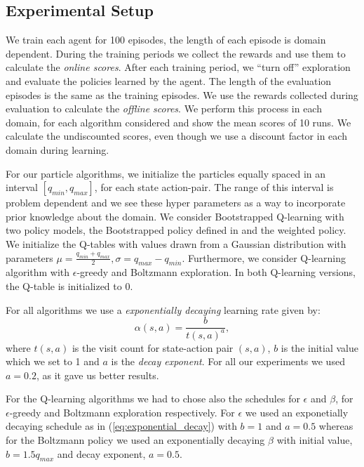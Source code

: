 \subsection{Experimental Setup}
We train each agent for 100 episodes, the length of each episode is domain dependent. During the training periods we collect the rewards and use them to calculate the \emph{online scores}. After each training period, we ``turn off'' exploration and evaluate the policies learned by the agent. The length of the evaluation episodes is the same as the training episodes. We use the rewards collected during evaluation to calculate the \emph{offline scores}. We perform this process in each domain, for each algorithm considered and show the mean scores of 10 runs. We calculate the undiscounted scores, even though we use a discount factor in each domain during learning.\par
For our particle algorithms, we initialize the particles equally spaced in an interval $[q_{min}, q_{max}]$, for each state action-pair. The range of this interval is problem dependent and we see these hyper parameters as a way to incorporate prior knowledge about the domain. We consider Bootstrapped Q-learning with two policy models, the Bootstrapped policy defined in \cite{DBLP:journals/corr/OsbandBPR16} and the weighted policy. We initialize the Q-tables with values drawn from a Gaussian distribution with parameters $\mu=\frac{q_{min}+q_{max}}{2},\sigma=q_{max}-q_{min}$. Furthermore, we consider Q-learning algorithm with $\epsilon$-greedy and Boltzmann exploration. In both Q-learning versions, the Q-table is initialized to 0.\par
For all algorithms we use a \emph{exponentially decaying} learning rate given by:
\begin{equation}
\label{eq:exponential_decay}
\alpha(s,a) = \frac{b}{t(s,a)^a},
\end{equation}
where $t(s,a)$ is the visit count for state-action pair $(s,a)$, $b$ is the initial value which we set to 1 and $a$ is the \emph{decay exponent}. For all our experiments we used $a=0.2$, as it gave us better results.\par
For the Q-learning algorithms we had to chose also the schedules for $\epsilon$ and $\beta$, for $\epsilon$-greedy and Boltzmann exploration respectively. For $\epsilon$ we used an exponetially decaying schedule as in (\ref{eq:exponential_decay}) with $b=1$ and $a=0.5$ whereas for the Boltzmann policy we used an exponentially decaying $\beta$ with initial value, $b=1.5q_{max}$ and decay exponent, $a=0.5$. 
